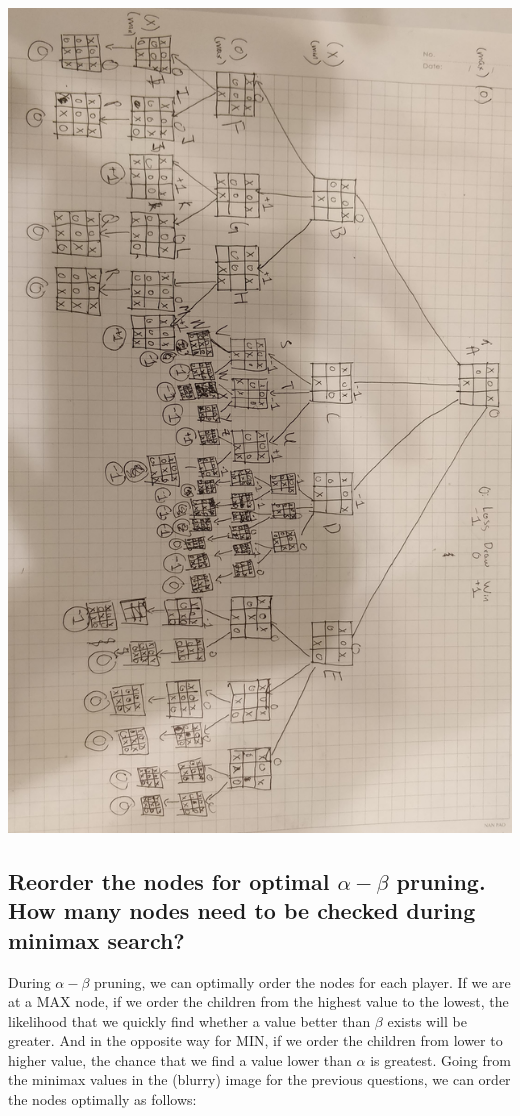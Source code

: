\documentclass{article}
\begin{document}
		\begin{center}
		\includegraphics[scale=0.1, angle=90]{tree}
		\end{center}
	\subsection{Reorder the nodes for optimal $\alpha-\beta$ pruning. How many nodes need to be checked 
	during minimax search?}
		During $\alpha - \beta$ pruning, we can optimally order the nodes for each player. If we are at 
		a MAX node, if we order the children from the highest value to the lowest, the likelihood that
		we quickly find whether a value better than $\beta$ exists will be greater. And in the opposite way
		for MIN, if we order the children from lower to higher value, the chance that we find a value
		lower than $\alpha$ is greatest. Going from the minimax values in the (blurry) image for the 
		previous questions, we can order the nodes optimally as follows:
\end{document}
